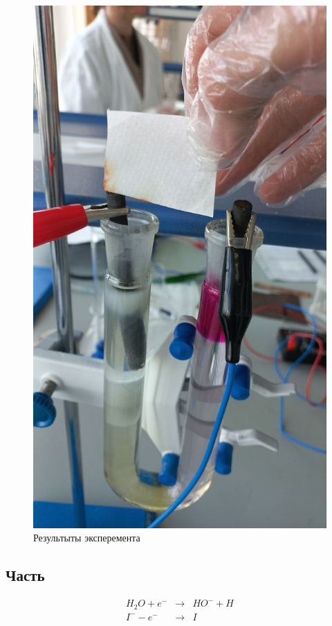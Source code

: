 \begin{figure}[h]
    \centering
    \includegraphics[trim={0 15cm 0 10cm},clip,width=\textwidth]{Ex_5/Ex_5_2.jpg}
     \caption{Результыты эксперемента}
    \label{Ex_5_2}
\end{figure}

\subsection{Часть}
\begin{eqnarray}
    H_2O + e^- &\to&  HO^- + H \\
    I^- - e^- &\to& I  
\end{eqnarray}


